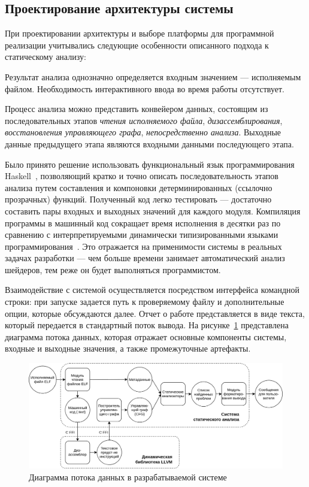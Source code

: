 \documentclass[a4paper,14pt]{extarticle}
\begin{document}
{\subsection{Проектирование архитектуры системы}
\label{section:system-design}

При проектировании архитектуры и выборе платформы для программной реализации
учитывались следующие особенности описанного подхода к статическому анализу:
\begin{ul}
\item Результат анализа однозначно определяется входным значением —
исполняемым файлом. Необходимость интерактивного ввода во время работы отсутствует.
\item Процесс анализа можно представить конвейером данных, состоящим из
последовательных этапов \textit{чтения исполняемого файла}, \textit{дизассемблирования},
\textit{восстановления управляющего графа}, \textit{непосредственно анализа}.
Выходные данные предыдущего этапа являются входными данными последующего этапа.
\end{ul}

Было принято решение использовать функциональный язык программирования
Haskell~\cite{haskell}, позволяющий кратко и точно описать последовательность этапов анализа
путем составления и компоновки детерминированных (ссылочно прозрачных) функций.
Полученный код легко тестировать — достаточно составить пары входных и выходных
значений для каждого модуля. Компиляция программы в машинный код сокращает время
исполнения в десятки раз по сравнению с интерпретируемыми динамически типизированными
языками программирования~\cite{rwhaskell}. Это отражается на применимости системы в
реальных задачах разработки — чем больше времени занимает автоматический анализ шейдеров,
тем реже он будет выполняться программистом.

Взаимодействие с системой осуществляется посредством интерфейса командной строки: при
запуске задается путь к проверяемому файлу и дополнительные опции, которые обсуждаются
далее. Отчет о работе представляется в виде текста, который передается в стандартный поток
вывода. На рисунке~\ref{fig:diagram-arch} представлена диаграмма потока данных,
которая отражает основные компоненты системы, входные и выходные значения,
а также промежуточные артефакты.

\begin{figure}[H]
\centering
\includegraphics[width=1.01\textwidth]{diagrams/arch}
\caption{Диаграмма потока данных в разрабатываемой системе}
\label{fig:diagram-arch}
\end{figure}

}
\end{document}
